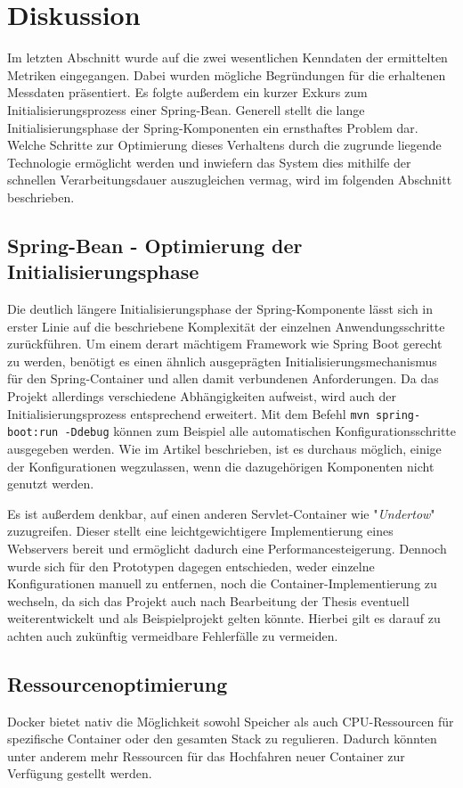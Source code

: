 \section{Diskussion}
Im letzten Abschnitt wurde auf die zwei wesentlichen Kenndaten der ermittelten Metriken eingegangen. Dabei wurden mögliche Begründungen für die erhaltenen Messdaten präsentiert. Es folgte außerdem ein kurzer Exkurs zum Initialisierungsprozess einer Spring-Bean. Generell stellt die lange Initialisierungsphase der Spring-Komponenten ein ernsthaftes Problem dar. Welche Schritte zur Optimierung dieses Verhaltens durch die zugrunde liegende Technologie ermöglicht werden und inwiefern das System dies mithilfe der schnellen Verarbeitungsdauer auszugleichen vermag, wird im folgenden Abschnitt beschrieben. 

\subsection{Spring-Bean - Optimierung der Initialisierungsphase}
\label{ss:spring-perf}

Die deutlich längere Initialisierungsphase der Spring-Komponente lässt sich in erster Linie auf die beschriebene Komplexität der einzelnen Anwendungsschritte zurückführen. Um einem derart mächtigem Framework wie Spring Boot gerecht zu werden, benötigt es einen ähnlich ausgeprägten Initialisierungsmechanismus für den Spring-Container und allen damit verbundenen Anforderungen. Da das Projekt allerdings verschiedene Abhängigkeiten aufweist, wird auch der Initialisierungsprozess entsprechend erweitert. Mit dem Befehl \verb+mvn spring-boot:run -Ddebug+ können zum Beispiel alle automatischen Konfigurationsschritte ausgegeben werden. Wie im Artikel \cite{spring-perf} beschrieben, ist es durchaus möglich, einige der Konfigurationen wegzulassen, wenn die dazugehörigen Komponenten nicht genutzt werden. 

Es ist außerdem denkbar, auf einen anderen Servlet-Container wie "\emph{Undertow}" zuzugreifen. Dieser stellt eine leichtgewichtigere Implementierung eines Webservers bereit und ermöglicht dadurch eine Performancesteigerung. Dennoch wurde sich für den Prototypen dagegen entschieden, weder einzelne Konfigurationen manuell zu entfernen, noch die Container-Implementierung zu wechseln, da sich das Projekt auch nach Bearbeitung der Thesis eventuell weiterentwickelt und als Beispielprojekt gelten könnte. Hierbei gilt es darauf zu achten auch zukünftig vermeidbare Fehlerfälle zu vermeiden.


\subsection{Ressourcenoptimierung}
\label{par:resOpt}
Docker bietet nativ die Möglichkeit sowohl Speicher als auch CPU-Ressourcen für spezifische Container oder den gesamten Stack zu regulieren. Dadurch könnten unter anderem mehr Ressourcen für das Hochfahren neuer Container zur Verfügung gestellt werden.

